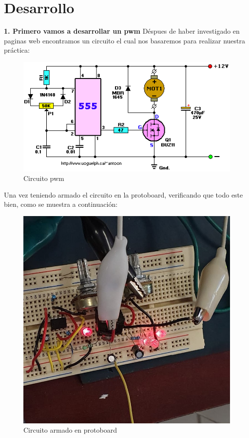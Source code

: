 \documentclass[10pt,a4paper]{article}
\begin{document}
\section{Desarrollo}
\textbf{1. Primero vamos a desarrollar un pwm}
Déspues de haber investigado en paginas web encontramos un circuito el cual nos basaremos para realizar nuestra práctica: 
\begin{figure}[hbtp]
\centering
\includegraphics[scale=1]{Pictures/555.PNG}
\caption{Circuito pwm}
\end{figure}

Una vez teniendo armado el circuito en la protoboard, verificando que todo este bien, como se muestra a continuación: 
\begin{figure}[hbtp]
\centering
\includegraphics[scale=0.5]{Pictures/pwm.jpeg}
\caption{Circuito armado en protoboard}
\end{figure}
\end{document}
